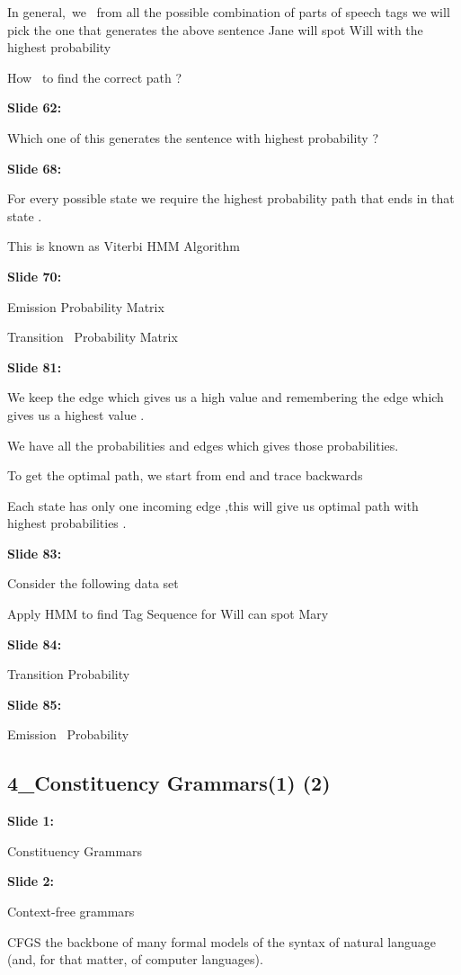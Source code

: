 \documentclass[11pt,a4paper]{article}
\begin{document}
In general, we  from all the possible combination of parts of speech tags we will pick the one that generates the above sentence Jane will spot Will with the highest probability

How  to find the correct path ?

\textbf{Slide 62:}

Which one of this generates the sentence with highest probability ?

\textbf{Slide 68:}

For every possible state we require the highest probability path that ends in that state .

This is known as Viterbi HMM Algorithm

\textbf{Slide 70:}

Emission Probability Matrix

Transition  Probability Matrix

\textbf{Slide 81:}

We keep the edge which gives us a high value and remembering the edge which gives us a highest value .

We have all the probabilities and edges which gives those probabilities.

To get the optimal path, we start from end and trace backwards

Each state has only one incoming edge ,this will give us optimal path with highest probabilities .

\textbf{Slide 83:}

Consider the following data set

Apply HMM to find Tag Sequence for Will can spot Mary

\textbf{Slide 84:}

Transition Probability

\textbf{Slide 85:}

Emission  Probability


\subsection{4_Constituency Grammars(1) (2)}

\textbf{Slide 1:}

Constituency Grammars

\textbf{Slide 2:}

Context-free grammars

CFGS the backbone of many formal models of the syntax of natural language (and, for that matter, of computer languages).
\end{document}
